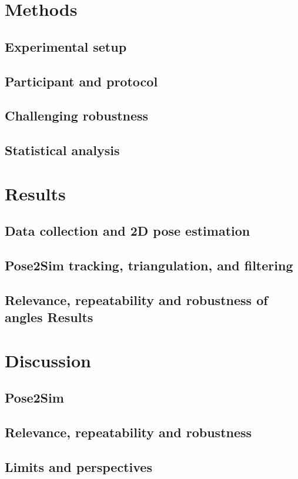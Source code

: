 \section{Methods}
\subsection{Experimental setup}
\blindtext

\subsection{Participant and protocol}
\blindtext

\subsection{Challenging robustness}
\blindtext

\subsection{Statistical analysis}
\blindtext


\section{Results}
\subsection{Data collection and 2D pose estimation}
\blindtext

\subsection{Pose2Sim tracking, triangulation, and filtering}
\blindtext

\subsection{Relevance, repeatability and robustness of angles Results}
\blindtext


\section{Discussion}
\subsection{Pose2Sim}
\blindtext

\subsection{Relevance, repeatability and robustness}
\blindtext

\subsection{Limits and perspectives}
\blindtext
